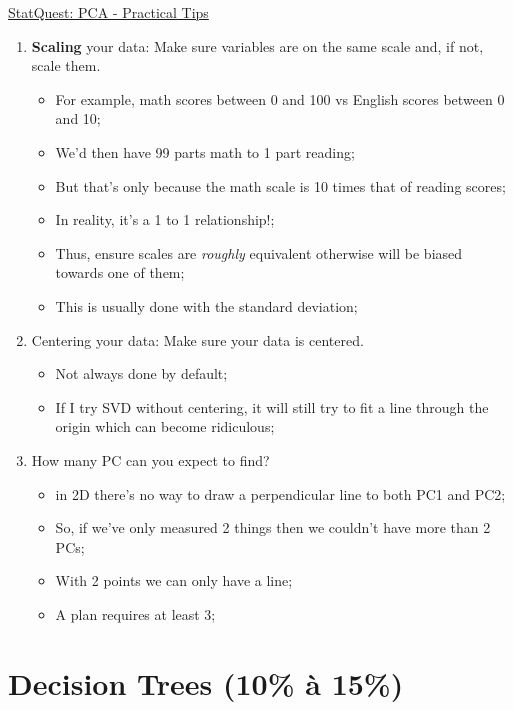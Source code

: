 \documentclass[12pt, titlepage, french]{report}
\begin{document}
\begin{YTB_SUMM}{\href{https://www.youtube.com/watch?v=oRvgq966yZg&list=PLblh5JKOoLUICTaGLRoHQDuF_7q2GfuJF&index=24}{StatQuest: PCA - Practical Tips}}
\begin{enumerate}
	\item	\textbf{Scaling} your data: Make sure variables are on the same scale and, if not, scale them.
		\begin{itemize}
		\item	For example, math scores between 0 and 100 vs English scores between 0 and 10;
		\item	We'd then have 99 parts math to 1 part reading;
		\item	But that's only because the math scale is 10 times that of reading scores;
		\item	In reality, it's a 1 to 1 relationship!;
		\item	Thus, ensure scales are \textit{roughly} equivalent otherwise will be biased towards one of them;
		\item	This is usually done with the standard deviation;
		\end{itemize}
	\item	Centering your data: Make sure your data is centered.
		\begin{itemize}
		\item	Not always done by default;
		\item	If I try SVD without centering, it will still try to fit a line through the origin which can become ridiculous;
		\end{itemize}
	\item	How many PC can you expect to find?
		\begin{itemize}
		\item	in 2D there's no way to draw a perpendicular line to both PC1 and PC2;
		\item	So, if we've only measured 2 things then we couldn't have more than 2 PCs;
		\item	With 2 points we can only have a line;
		\item	A plan requires at least 3;
		
		\end{itemize}
\end{enumerate}
\end{YTB_SUMM}

\newpage
\chapter[Decision Trees]{Decision Trees (10\% à 15\%)}
\end{document}
